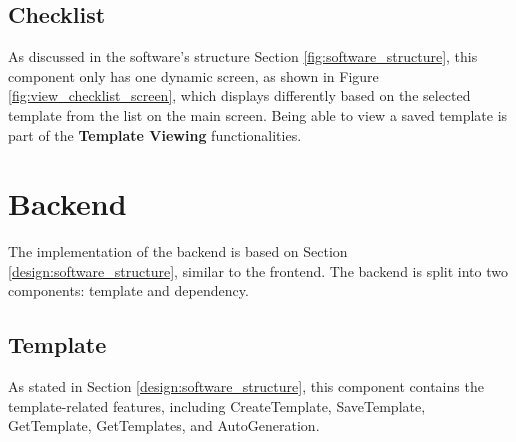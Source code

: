 \subsection{Checklist}
\label{im:view_checklist}

As discussed in the software's structure Section \ref{fig:software_structure}, this component only has one dynamic screen, as shown in Figure \ref{fig:view_checklist_screen}, which displays differently based on the selected template from the list on the main screen. Being able to view a saved template is part of the \textbf{Template Viewing} functionalities.


\section{Backend}
\label{im:backend}

The implementation of the backend is based on Section \ref{design:software_structure}, similar to the frontend. The backend is split into two components: template and dependency.







\subsection{Template}
\label{backend_template}
As stated in Section \ref{design:software_structure}, this component contains the template-related features, including CreateTemplate, SaveTemplate, GetTemplate, GetTemplates, and AutoGeneration.

